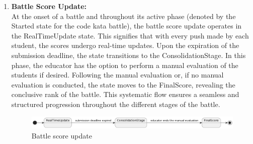 \begin{enumerate}
    \item \textbf{Battle Score Update:} \\
    At the onset of a battle and throughout its active phase (denoted by the Started state for the code kata battle), the battle score update operates in the RealTimeUpdate state. This signifies that with every push made by each student, the scores undergo real-time updates. Upon the expiration of the submission deadline, the state transitions to the ConsolidationStage. In this phase, the educator has the option to perform a manual evaluation of the students if desired. Following the manual evaluation or, if no manual evaluation is conducted, the state moves to the FinalScore, revealing the conclusive rank of the battle. This systematic flow ensures a seamless and structured progression throughout the different stages of the battle.
        \begin{figure}[h!]
              \centering
              \includegraphics[width=1\textwidth]{Images/BattleScoreUpdate.png}
              \caption{Battle score update}
              \label{fig:CKBLifecycle}
        \end{figure}
    
\end{enumerate}

